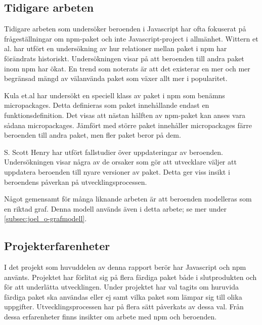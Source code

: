 \subsection{Tidigare arbeten}
Tidigare arbeten som undersöker beroenden i Javascript har ofta fokuserat på frågeställningar om npm-paket och inte Javascript-project i allmänhet. Wittern et al. har utfört en undersökning av hur relationer mellan paket i npm har förändrats historiskt.\cite{Wittern:2016} Undersökningen visar på att beroenden till andra paket inom npm har ökat. En trend som noterats är att det existerar en mer och mer begränsad mängd av välanvända paket som växer allt mer i popularitet.

Kula et.al har undersökt en speciell klass av paket i npm som benämns micropackages.\cite{Kula2017} Detta definieras som paket innehållande endast en funktionsdefinition. Det visas att nästan hälften av npm-paket kan anses vara sådana micropackages. Jämfört med större paket innehåller micropackages färre beroenden till andra paket, men fler paket beror på dem.

S. Scott Henry har utfört fallstudier över uppdateringar av beroenden.\cite{Henry2017} Undersökningen visar några av de orsaker som gör att utvecklare väljer att uppdatera beroenden till nyare versioner av paket. Detta ger viss insikt i beroendens påverkan på utvecklingsprocessen.

Något gemensamt för många liknande arbeten är att beroenden modelleras som en riktad graf. Denna modell används även i detta arbete; se mer under \ref{subsec:joel_o-grafmodell}.

\subsection{Projekterfarenheter}
I det projekt som huvuddelen av denna rapport berör har Javascript och npm använts. Projektet har förlitat sig på flera färdiga paket både i slutprodukten och för att underlätta utvecklingen. Under projektet har val tagits om huruvida färdiga paket ska användas eller ej samt vilka paket som lämpar sig till olika uppgifter. Utvecklingsprocessen har på flera sätt påverkats av dessa val. Från dessa erfarenheter finns insikter om arbete med npm och beroenden.
